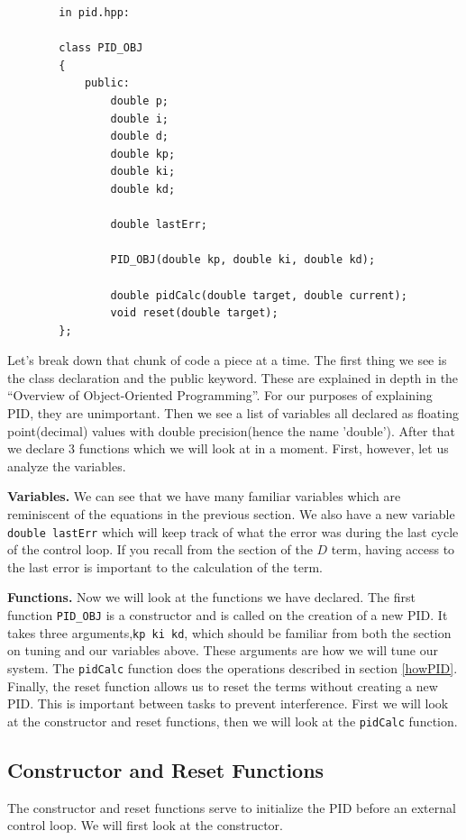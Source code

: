 \documentclass[12pt]{report}
\begin{document}
    \begin{verbatim}
        in pid.hpp:

        class PID_OBJ
        {
            public:
                double p;
                double i;
                double d;
                double kp;
                double ki;
                double kd;

                double lastErr;

                PID_OBJ(double kp, double ki, double kd);

                double pidCalc(double target, double current);
                void reset(double target);
        };
    \end{verbatim}

    Let's break down that chunk of code a piece at a time. 
    The first thing we see is the class declaration and the public keyword. 
    These are explained in depth in the ``Overview of Object-Oriented Programming''.
    For our purposes of explaining PID, they are unimportant. 
    Then we see a list of variables all declared as floating point(decimal) values with double precision(hence the name 'double').
    After that we declare 3 functions which we will look at in a moment. 
    First, however, let us analyze the variables.

   \textbf{Variables.} We can see that we have many familiar variables which are reminiscent of the equations in the previous section. 
   We also have a new variable \verb|double lastErr| which will keep track of what the error was during the last cycle of the control loop.
   If you recall from the section of the $D$ term, 
   having access to the last error is important to the calculation of the term.

    \textbf{Functions.} Now we will look at the functions we have declared.
    The first function \verb|PID_OBJ| is a constructor and is called on the creation of a new PID. 
    It takes three arguments,\verb|kp ki kd|, which should be familiar from both the section on tuning and our variables above. 
    These arguments are how we will tune our system.
    The \verb|pidCalc| function does the operations described in section \ref{howPID}. 
    Finally, the reset function allows us to reset the terms without creating a new PID. 
    This is important between tasks to prevent interference.
    First we will look at the constructor and reset functions, then we will look at the \verb|pidCalc| function.

\subsection{Constructor and Reset Functions}
    The constructor and reset functions serve to initialize the PID before an external control loop. 
    We will first look at the constructor.
\end{document}
